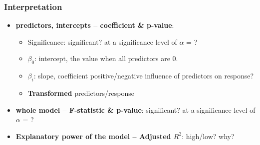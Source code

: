 \subsubsection*{Interpretation}
\begin{itemize}
	\item \textbf{predictors, intercepts -- coefficient \& p-value}: 
	\begin{itemize}
		\item Significance: significant? at a significance level of $\alpha$ = ?
		\item $\beta_0$: intercept, the value when all predictors are 0.
		\item $\beta_i$: slope, coefficient positive/negative influence of predictors on response? 
		\item \textbf{Transformed} predictors/response
	\end{itemize} 
	\item \textbf{whole model -- F-statistic \& p-value}: significant? at a significance level of $\alpha$ = ?
	\item \textbf{Explanatory power of the model -- Adjusted $R^2$}: high/low? why?
	
\end{itemize}



